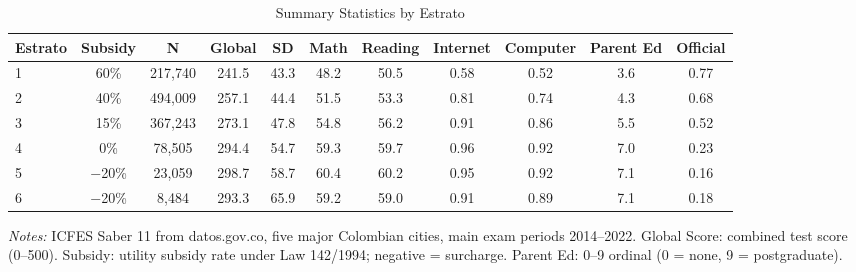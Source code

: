 \begin{table}[htbp]
\centering
\caption{Summary Statistics by Estrato}
\label{tab:summary}
\begin{adjustbox}{max width=\textwidth}
\begin{tabular}{lcccccccccc}
\toprule
Estrato & Subsidy & N & Global & SD & Math & Reading & Internet & Computer & Parent Ed & Official \\
\midrule
1 & 60\% & 217,740 & 241.5 & 43.3 & 48.2 & 50.5 & 0.58 & 0.52 & 3.6 & 0.77 \\
2 & 40\% & 494,009 & 257.1 & 44.4 & 51.5 & 53.3 & 0.81 & 0.74 & 4.3 & 0.68 \\
3 & 15\% & 367,243 & 273.1 & 47.8 & 54.8 & 56.2 & 0.91 & 0.86 & 5.5 & 0.52 \\
4 & 0\% & 78,505 & 294.4 & 54.7 & 59.3 & 59.7 & 0.96 & 0.92 & 7.0 & 0.23 \\
5 & $-$20\% & 23,059 & 298.7 & 58.7 & 60.4 & 60.2 & 0.95 & 0.92 & 7.1 & 0.16 \\
6 & $-$20\% & 8,484 & 293.3 & 65.9 & 59.2 & 59.0 & 0.91 & 0.89 & 7.1 & 0.18 \\
\bottomrule
\end{tabular}
\end{adjustbox}
\par\vspace{0.3em}
{\footnotesize \textit{Notes:} ICFES Saber 11 from datos.gov.co, five major Colombian cities, main exam periods 2014--2022. Global Score: combined test score (0--500). Subsidy: utility subsidy rate under Law 142/1994; negative = surcharge. Parent Ed: 0--9 ordinal (0 = none, 9 = postgraduate).}
\end{table}

